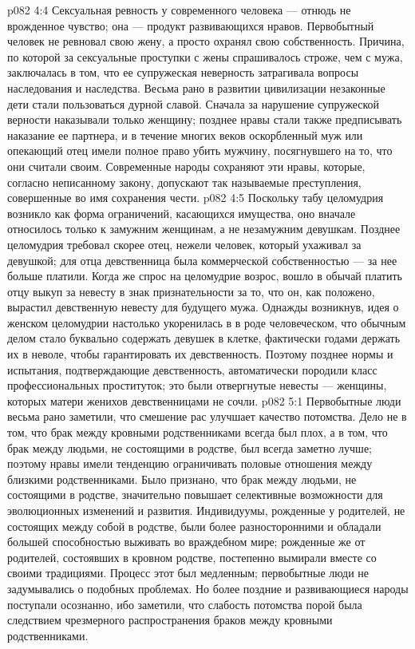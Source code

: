 \vs p082 4:4 Сексуальная ревность у современного человека --- отнюдь не врожденное чувство; она --- продукт развивающихся нравов. Первобытный человек не ревновал свою жену, а просто охранял свою собственность. Причина, по которой за сексуальные проступки с жены спрашивалось строже, чем с мужа, заключалась в том, что ее супружеская неверность затрагивала вопросы наследования и наследства. Весьма рано в развитии цивилизации незаконные дети стали пользоваться дурной славой. Сначала за нарушение супружеской верности наказывали только женщину; позднее нравы стали также предписывать наказание ее партнера, и в течение многих веков оскорбленный муж или опекающий отец имели полное право убить мужчину, посягнувшего на то, что они считали своим. Современные народы сохраняют эти нравы, которые, согласно неписанному закону, допускают так называемые преступления, совершенные во имя сохранения чести.
\vs p082 4:5 Поскольку табу целомудрия возникло как форма ограничений, касающихся имущества, оно вначале относилось только к замужним женщинам, а не незамужним девушкам. Позднее целомудрия требовал скорее отец, нежели человек, который ухаживал за девушкой; для отца девственница была коммерческой собственностью --- за нее больше платили. Когда же спрос на целомудрие возрос, вошло в обычай платить отцу выкуп за невесту в знак признательности за то, что он, как положено, вырастил девственную невесту для будущего мужа. Однажды возникнув, идея о женском целомудрии настолько укоренилась в в роде человеческом, что обычным делом стало буквально содержать девушек в клетке, фактически годами держать их в неволе, чтобы гарантировать их девственность. Поэтому позднее нормы и испытания, подтверждающие девственность, автоматически породили класс профессиональных проституток; это были отвергнутые невесты --- женщины, которых матери женихов девственницами не сочли.
\vs p082 5:1 Первобытные люди весьма рано заметили, что смешение рас улучшает качество потомства. Дело не в том, что брак между кровными родственниками всегда был плох, а в том, что брак между людьми, не состоящими в родстве, был всегда заметно лучше; поэтому нравы имели тенденцию ограничивать половые отношения между близкими родственниками. Было признано, что брак между людьми, не состоящими в родстве, значительно повышает селективные возможности для эволюционных изменений и развития. Индивидуумы, рожденные у родителей, не состоящих между собой в родстве, были более разносторонними и обладали большей способностью выживать во враждебном мире; рожденные же от родителей, состоявших в кровном родстве, постепенно вымирали вместе со своими традициями. Процесс этот был медленным; первобытные люди не задумывались о подобных проблемах. Но более поздние и развивающиеся народы поступали осознанно, ибо заметили, что слабость потомства порой была следствием чрезмерного распространения браков между кровными родственниками.
